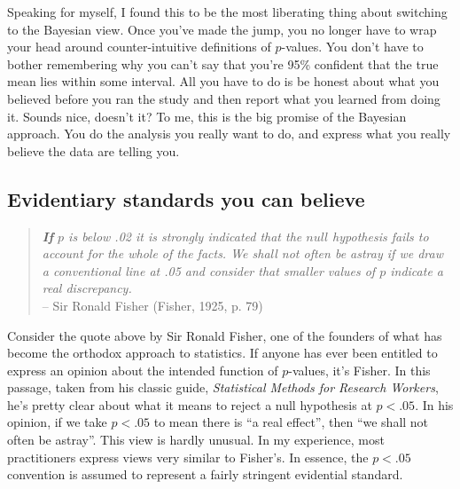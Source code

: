 \documentclass[
  a4paper,
]{book}
\begin{document}
Speaking for myself, I found this to be the most liberating thing about
switching to the Bayesian view. Once you've made the jump, you no longer
have to wrap your head around counter-intuitive definitions of
\(p\)-values. You don't have to bother remembering why you can't say
that you're 95\% confident that the true mean lies within some interval.
All you have to do is be honest about what you believed before you ran
the study and then report what you learned from doing it. Sounds nice,
doesn't it? To me, this is the big promise of the Bayesian approach. You
do the analysis you really want to do, and express what you really
believe the data are telling you.

\hypertarget{evidentiary-standards-you-can-believe}{%
\subsection{Evidentiary standards you can
believe}\label{evidentiary-standards-you-can-believe}}

\begin{quote}
\emph{\textbf{If} \(p\) is below .02 it is strongly indicated that the
\(null\) hypothesis fails to account for the whole of the facts. We
shall not often be astray if we draw a conventional line at .05 and
consider that smaller values of \(p\) indicate a real discrepancy.}\\
-- Sir Ronald Fisher (Fisher, 1925, p. 79)
\end{quote}

Consider the quote above by Sir Ronald Fisher, one of the founders of
what has become the orthodox approach to statistics. If anyone has ever
been entitled to express an opinion about the intended function of
\(p\)-values, it's Fisher. In this passage, taken from his classic
guide, \emph{Statistical Methods for Research Workers}, he's pretty
clear about what it means to reject a null hypothesis at \(p < .05\). In
his opinion, if we take \(p < .05\) to mean there is ``a real effect'',
then ``we shall not often be astray''. This view is hardly unusual. In
my experience, most practitioners express views very similar to
Fisher's. In essence, the \(p < .05\) convention is assumed to represent
a fairly stringent evidential standard.
\end{document}
